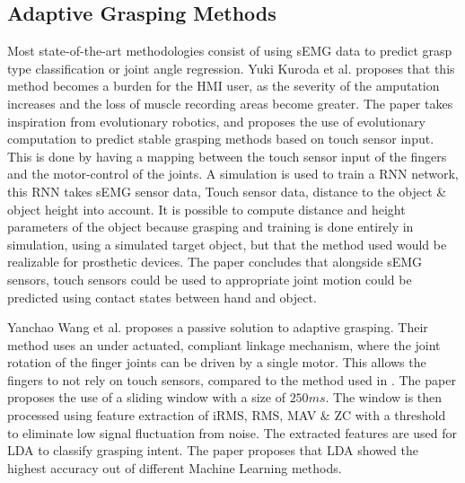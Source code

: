 \documentclass[../main.tex]{subfiles}
\begin{document}
\subsection{Adaptive Grasping Methods}
Most state-of-the-art methodologies consist of using sEMG data to predict grasp type classification or joint angle regression.
Yuki Kuroda et al. \cite{Yuki2023} proposes that this method becomes a burden for the HMI user, as the severity of the amputation increases and the loss of muscle recording areas become greater.
The paper takes inspiration from evolutionary robotics, and proposes the use of evolutionary computation to predict stable grasping methods based on touch sensor input.
This is done by having a mapping between the touch sensor input of the fingers and the motor-control of the joints.
A simulation is used to train a \gls{RNN} network, this RNN takes sEMG sensor data, Touch sensor data, distance to the object \& object height into account.
It is possible to compute distance and height parameters of the object because grasping and training is done entirely in simulation, using a simulated target object, but that the method used would be realizable for prosthetic devices. 
The paper concludes that alongside sEMG sensors, touch sensors could be used to appropriate joint motion could be predicted using contact states between hand and object.

Yanchao Wang et al. \cite{YanchaoWang2022} proposes a passive solution to adaptive grasping.
Their method uses an under actuated, compliant linkage mechanism, where the joint rotation of the finger joints can be driven by a single motor.
This allows the fingers to not rely on touch sensors, compared to the method used in \cite{Yuki2023}.
The paper proposes the use of a sliding window with a size of $250ms$.
The window is then processed using feature extraction of \gls{iRMS}, \gls{RMS}, \gls{MAV} \& \gls{ZC} with a threshold to eliminate low signal fluctuation from noise.
The extracted features are used for \gls{LDA} to classify grasping intent. 
The paper proposes that LDA showed the highest accuracy out of different Machine Learning methods.
\end{document}
